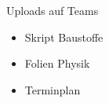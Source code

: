 
\begin{frame}{Uploads auf Teams}
    \begin{itemize}
        \item Skript Baustoffe
        \item Folien Physik
        \item Terminplan
    \end{itemize}
    
\end{frame}


